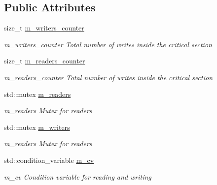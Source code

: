 \subsection*{Public Attributes}
\begin{DoxyCompactItemize}
\item 
\mbox{\label{structthread__safety__t_a677aeea808312a3d8b1b0cc359e14776}} 
size\+\_\+t \mbox{\hyperlink{structthread__safety__t_a677aeea808312a3d8b1b0cc359e14776}{m\+\_\+writers\+\_\+counter}}
\begin{DoxyCompactList}\small\item\em m\+\_\+writers\+\_\+counter Total number of writes inside the critical section \end{DoxyCompactList}\item 
\mbox{\label{structthread__safety__t_a5e0bfc26f61f8bda0437fe3fed174422}} 
size\+\_\+t \mbox{\hyperlink{structthread__safety__t_a5e0bfc26f61f8bda0437fe3fed174422}{m\+\_\+readers\+\_\+counter}}
\begin{DoxyCompactList}\small\item\em m\+\_\+readers\+\_\+counter Total number of writes inside the critical section \end{DoxyCompactList}\item 
\mbox{\label{structthread__safety__t_a9977ce08d76081d55f504f0371477b4d}} 
std\+::mutex \mbox{\hyperlink{structthread__safety__t_a9977ce08d76081d55f504f0371477b4d}{m\+\_\+readers}}
\begin{DoxyCompactList}\small\item\em m\+\_\+readers Mutex for readers \end{DoxyCompactList}\item 
\mbox{\label{structthread__safety__t_abad9ad9117a5de2cdc12c1589b0b2891}} 
std\+::mutex \mbox{\hyperlink{structthread__safety__t_abad9ad9117a5de2cdc12c1589b0b2891}{m\+\_\+writers}}
\begin{DoxyCompactList}\small\item\em m\+\_\+readers Mutex for readers \end{DoxyCompactList}\item 
\mbox{\label{structthread__safety__t_aae8e6b7efcf6cdf33bb37ef025c872c1}} 
std\+::condition\+\_\+variable \mbox{\hyperlink{structthread__safety__t_aae8e6b7efcf6cdf33bb37ef025c872c1}{m\+\_\+cv}}
\begin{DoxyCompactList}\small\item\em m\+\_\+cv Condition variable for reading and writing \end{DoxyCompactList}\end{DoxyCompactItemize}
